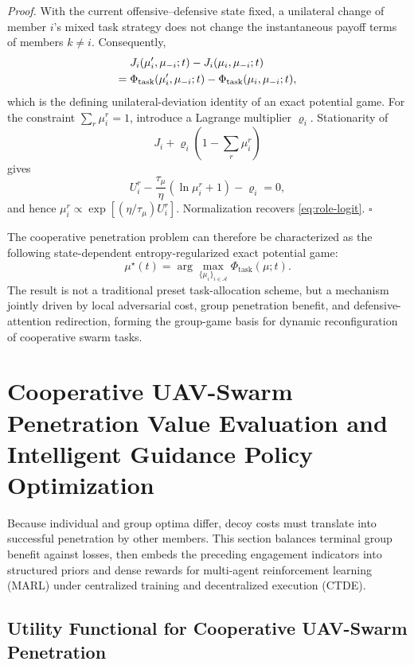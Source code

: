 \documentclass{cja}
\begin{document}
\noindent\textit{Proof.} With the current offensive--defensive state fixed, a unilateral change of member $i$'s mixed task strategy does not change the instantaneous payoff terms of members $k\ne i$. Consequently,
\begin{align}
&J_i(\mu_i',\mu_{-i};t)-J_i(\mu_i,\mu_{-i};t)\notag\\
={}&\Phi_{\mathrm{task}}(\mu_i',\mu_{-i};t)
-\Phi_{\mathrm{task}}(\mu_i,\mu_{-i};t),
\end{align}
which is the defining unilateral-deviation identity of an exact potential game. For the constraint $\sum_r\mu_i^r=1$, introduce a Lagrange multiplier $\varrho_i$. Stationarity of
\begin{equation*}
J_i+\varrho_i\left(1-\sum_r\mu_i^r\right)
\end{equation*}
gives
\begin{equation*}
U_i^r-\frac{\tau_\mu}{\eta}\left(\ln\mu_i^r+1\right)-\varrho_i=0,
\end{equation*}
and hence $\mu_i^r\propto\exp[(\eta/\tau_\mu)U_i^r]$. Normalization recovers \eqref{eq:role-logit}. \hfill$\square$

The cooperative penetration problem can therefore be characterized as the following state-dependent entropy-regularized exact potential game:
\begin{equation}
\mu^{\star}(t)
=
\arg\max_{\{\mu_i\}_{i\in\mathcal{A}}}
\Phi_{\mathrm{task}}(\mu;t).
\end{equation}
The result is not a traditional preset task-allocation scheme, but a mechanism jointly driven by local adversarial cost, group penetration benefit, and defensive-attention redirection, forming the group-game basis for dynamic reconfiguration of cooperative swarm tasks.

\section{Cooperative UAV-Swarm Penetration Value Evaluation and Intelligent Guidance Policy Optimization}

Because individual and group optima differ, decoy costs must translate into successful penetration by other members. This section balances terminal group benefit against losses, then embeds the preceding engagement indicators into structured priors and dense rewards for multi-agent reinforcement learning (MARL) under centralized training and decentralized execution (CTDE).

\subsection{Utility Functional for Cooperative UAV-Swarm Penetration}
\end{document}
